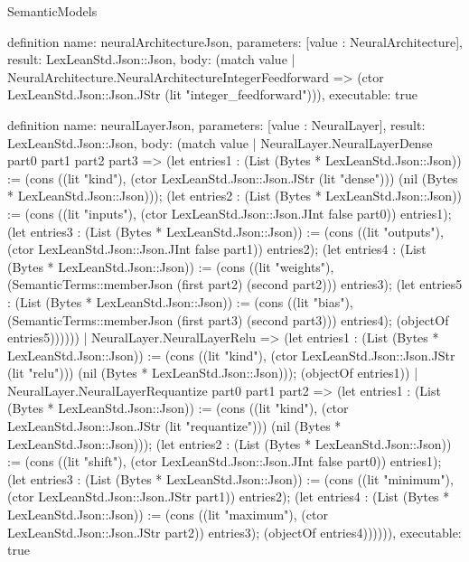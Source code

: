\begin{lexlean}{SemanticModels}
\begin{semanticmodule}
definition{
  name: neuralArchitectureJson,
  parameters: [value : NeuralArchitecture],
  result: LexLeanStd.Json::Json,
  body: (match value
    | NeuralArchitecture.NeuralArchitectureIntegerFeedforward => (ctor LexLeanStd.Json::Json.JStr (lit "integer_feedforward"))),
  executable: true
}

definition{
  name: neuralLayerJson,
  parameters: [value : NeuralLayer],
  result: LexLeanStd.Json::Json,
  body: (match value
    | NeuralLayer.NeuralLayerDense part0 part1 part2 part3 => (let entries1 : (List (Bytes * LexLeanStd.Json::Json)) := (cons ((lit "kind"), (ctor LexLeanStd.Json::Json.JStr (lit "dense"))) (nil (Bytes * LexLeanStd.Json::Json))); (let entries2 : (List (Bytes * LexLeanStd.Json::Json)) := (cons ((lit "inputs"), (ctor LexLeanStd.Json::Json.JInt false part0)) entries1); (let entries3 : (List (Bytes * LexLeanStd.Json::Json)) := (cons ((lit "outputs"), (ctor LexLeanStd.Json::Json.JInt false part1)) entries2); (let entries4 : (List (Bytes * LexLeanStd.Json::Json)) := (cons ((lit "weights"), (SemanticTerms::memberJson (first part2) (second part2))) entries3); (let entries5 : (List (Bytes * LexLeanStd.Json::Json)) := (cons ((lit "bias"), (SemanticTerms::memberJson (first part3) (second part3))) entries4); (objectOf entries5))))))
    | NeuralLayer.NeuralLayerRelu => (let entries1 : (List (Bytes * LexLeanStd.Json::Json)) := (cons ((lit "kind"), (ctor LexLeanStd.Json::Json.JStr (lit "relu"))) (nil (Bytes * LexLeanStd.Json::Json))); (objectOf entries1))
    | NeuralLayer.NeuralLayerRequantize part0 part1 part2 => (let entries1 : (List (Bytes * LexLeanStd.Json::Json)) := (cons ((lit "kind"), (ctor LexLeanStd.Json::Json.JStr (lit "requantize"))) (nil (Bytes * LexLeanStd.Json::Json))); (let entries2 : (List (Bytes * LexLeanStd.Json::Json)) := (cons ((lit "shift"), (ctor LexLeanStd.Json::Json.JInt false part0)) entries1); (let entries3 : (List (Bytes * LexLeanStd.Json::Json)) := (cons ((lit "minimum"), (ctor LexLeanStd.Json::Json.JStr part1)) entries2); (let entries4 : (List (Bytes * LexLeanStd.Json::Json)) := (cons ((lit "maximum"), (ctor LexLeanStd.Json::Json.JStr part2)) entries3); (objectOf entries4)))))),
  executable: true
}


\end{semanticmodule}
\end{lexlean}
